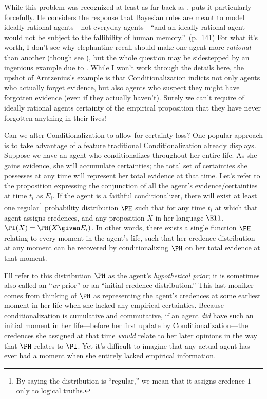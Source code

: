 While this problem was recognized at least as far back as \citet{LeviDemons}, \citet{TalbottTwoPrinciples} puts it particularly forcefully. He considers the response that Bayesian rules are meant to model ideally rational agents---not everyday agents---``and an ideally rational agent would not be subject to the fallibility of human memory.''\ (p.\ 141) For what it's worth, I don't see why elephantine recall should make one agent more \emph{rational} than another (though see \citealp{CarrDontStop}), but the whole question may be sidestepped by an ingenious example due to \citet{ArntzeniusProblems}. While I won't work through the details here, the upshot of Arntzenius's example is that Conditionalization indicts not only agents who actually forget evidence, but also agents who suspect they might have forgotten evidence (even if they actually haven't). Surely we can't require of ideally rational agents certainty of the empirical proposition that they have never forgotten anything in their lives!

Can we alter Conditionalization to allow for certainty loss? One popular approach is to take advantage of a feature traditional Conditionalization already displays. Suppose we have an agent who conditionalizes throughout her entire life. As she gains evidence, she will accumulate certainties; the total set of certainties she possesses at any time will represent her total evidence at that time. Let's refer to the proposition expressing the conjunction of all the agent's evidence/certainties at time $t_i$ as $E_i$. If the agent is a faithful conditionalizer, there will exist at least one regular\footnote
{By saying the distribution is ``regular,'' we mean that it assigns credence $1$ only to logical truths.} probability distribution $\PH$ such that for any time $t_i$ at which that agent assigns credences, and any proposition $X$ in her language $\Ell$, $\PI(X)=\PH(X \given E_i)$. In other words, there exists a single function $\PH$ relating to every moment in the agent's life, such that her credence distribution at any moment can be recovered by conditionalizing $\PH$ on her total evidence at that moment.

I'll refer to this distribution $\PH$ as the agent's \textit{hypothetical prior}; it is sometimes also called an ``\emph{ur}-prior'' or an ``initial credence distribution.'' This last moniker comes from thinking of $\PH$ as representing the agent's credences at some earliest moment in her life when she lacked any empirical certainties. Because conditionalization is cumulative and commutative, if an agent \emph{did} have such an initial moment in her life---before her first update by Conditionalization---the credences she assigned at that time \emph{would} relate to her later opinions in the way that $\PH$ relates to $\PI$. Yet it's difficult to imagine that any actual agent has ever had a moment when she entirely lacked empirical information.

